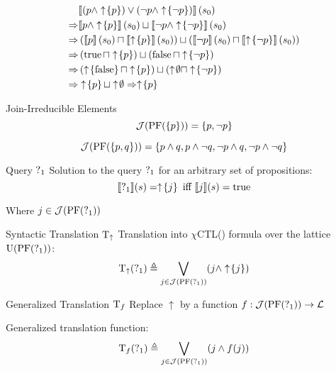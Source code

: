 \begin{frame}[t]
  \begin{align*}
    &\llbracket \left(p \land \upclos{p}\right) \lor 
      \left(\lnot p \land \upclos{\lnot p}\right) \rrbracket \left(s_0\right) \\
    \Rightarrow &\llbracket p \land \upclos{p} \rrbracket \left(s_0\right) \sqcup 
      \llbracket \lnot p \land \upclos{\lnot p} \rrbracket \left(s_0\right) \\
    \Rightarrow &\left(\llbracket p \rrbracket \left(s_0\right) \sqcap 
        \llbracket \upclos{p} \rrbracket \left(s_0\right)\right) \sqcup 
      \left(\llbracket \lnot p \rrbracket \left(s_0\right) \sqcap 
        \llbracket \upclos{\lnot p} \rrbracket \left(s_0\right)\right) \\
    \Rightarrow &\left(\true \sqcap \upclos{p}\right) \sqcup 
      \left(\false \sqcap \upclos{\lnot p}\right) \\
    \Rightarrow &\left(\upclos{\false} \sqcap \upclos{p}\right) \sqcup 
      \left(\uparrow\!\emptyset\sqcap \upclos{\lnot p}\right) \\
    \Rightarrow &\upclos{p} \sqcup \uparrow\!\emptyset
    \Rightarrow \upclos{p}
  \end{align*}
\end{frame}

\begin{frame}{Join-Irreducible Elements}
  \[ 
    \mathcal{J}(\operatorname{PF}(\{p\})) = \{ p, \lnot p \} 
  \]
  
  \[ 
    \mathcal{J}(\operatorname{PF}(\{p,q\})) = \{ p \land q, p \land \lnot q, 
                            \lnot p \land q, \lnot p \land \lnot q \} 
  \]
\end{frame}

\begin{frame}{Query $\operatorname{?}_1$}
  Solution to the query $\operatorname{?}_1$ for an arbitrary set of propositions:
  \[ \llbracket \operatorname{?}_1 \rrbracket (s) = \uparrow \! \left\{ j \right\} \text{ iff } \llbracket j \rrbracket (s) = \operatorname{true}
  \]
  
  Where $j\in\mathcal{J}(\operatorname{PF}(\operatorname{?}_1))$
\end{frame}

\begin{frame}{Syntactic Translation $\operatorname{T}_\uparrow$}
  Translation into $\chi$CTL(\mcL) formula over the lattice $\operatorname{U}(\operatorname{PF}(\operatorname{?}_1))$:
  \[ 
    \operatorname{T}_\uparrow(\operatorname{?}_1) \triangleq \bigvee_{j\in\mathcal{J}(\operatorname{PF}(\operatorname{?}_1))} (j \land \uparrow \! \left\{ j \right\})
  \]
\end{frame}

\begin{frame}{Generalized Translation $\operatorname{T}_f$}
  Replace $\uparrow$ by a function $f : \mathcal{J}(\operatorname{PF}(\operatorname{?}_1)) \to \mathcal{L}$

  Generalized translation function:
  \[ 
    \operatorname{T}_f(\operatorname{?}_1) \triangleq \bigvee_{j\in\mathcal{J}(\operatorname{PF}(\operatorname{?}_1))} (j \land f(j))
  \]
\end{frame}

